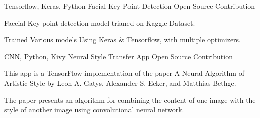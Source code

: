 

\begin{cventries}


  \cventry
    {Tensorflow, Keras, Python} %
    {Facial Key Point Detection} %
    {Open Source Contribution} %
    {} %
    {
      \begin{cvitems} %
        \item {Faceial Key point detection model trianed on Kaggle Dataset.}
        \item {Trained Various models Using Keras \& Tensorflow, with multiple optimizers.}
      \end{cvitems}
    }
  
  \cventry
    {CNN, Python, Kivy} %
    {Neural Style Transfer App} %
    {Open Source Contribution} %
    {} %
    {
      \begin{cvitems} %
        \item {This app is a TensorFlow implementation of the paper A Neural Algorithm of Artistic Style by Leon A. Gatys, Alexander S. Ecker, and Matthias Bethge.}
        \item {The paper presents an algorithm for combining the content of one image with the style of another image using convolutional neural network.}
      \end{cvitems}
    }
  

\end{cventries}
